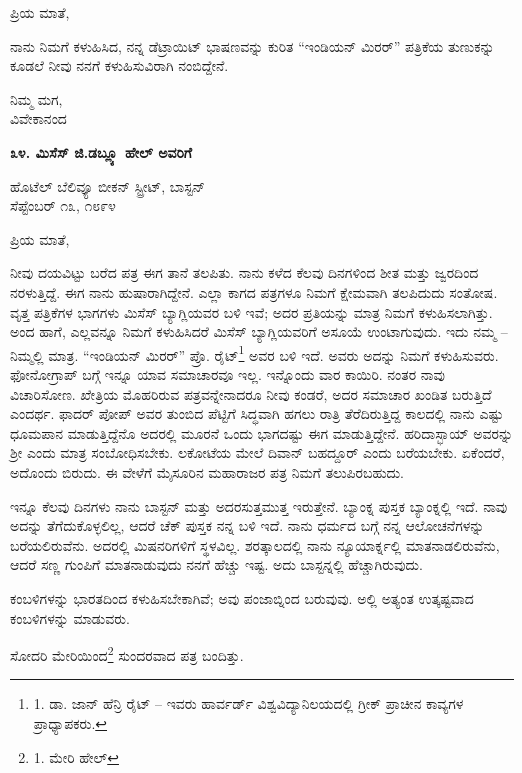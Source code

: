 ಪ್ರಿಯ ಮಾತೆ,

ನಾನು ನಿಮಗೆ ಕಳುಹಿಸಿದ, ನನ್ನ ಡೆಟ್ರಾಯಿಟ್ ಭಾಷಣವನ್ನು ಕುರಿತ “ಇಂಡಿಯನ್ ಮಿರರ್” ಪತ್ರಿಕೆಯ ತುಣುಕನ್ನು ಕೂಡಲೆ ನೀವು ನನಗೆ ಕಳುಹಿಸುವಿರಾಗಿ ನಂಬಿದ್ದೇನೆ.

\begin{flushright}
ನಿಮ್ಮ ಮಗ,\\ವಿವೇಕಾನಂದ
\end{flushright}

\begin{center}
\textbf{೩೪. ಮಿಸೆಸ್ ಜಿ.ಡಬ್ಲ್ಯೂ ಹೇಲ್ ಅವರಿಗೆ}
\end{center}

\begin{flushright}
ಹೊಟೆಲ್ ಬೆಲಿವ್ಯೂ ಬೀಕನ್ ಸ್ಟ್ರೀಟ್, ಬಾಸ್ಟನ್\\ಸೆಪ್ಟೆಂಬರ್ ೧೩, ೧೮೯೪
\end{flushright}

ಪ್ರಿಯ ಮಾತೆ,

ನೀವು ದಯವಿಟ್ಟು ಬರೆದ ಪತ್ರ ಈಗ ತಾನೆ ತಲಪಿತು. ನಾನು ಕಳೆದ ಕೆಲವು ದಿನಗಳಿಂದ ಶೀತ ಮತ್ತು ಜ್ವರದಿಂದ ನರಳುತ್ತಿದ್ದೆ. ಈಗ ನಾನು ಹುಷಾರಾಗಿದ್ದೇನೆ. ಎಲ್ಲಾ ಕಾಗದ ಪತ್ರಗಳೂ ನಿಮಗೆ ಕ್ಷೇಮವಾಗಿ ತಲಪಿದುದು ಸಂತೋಷ. ವೃತ್ತ ಪತ್ರಿಕೆಗಳ ಭಾಗಗಳು ಮಿಸೆಸ್ ಬ್ಯಾಗ್ಲಿಯವರ ಬಳಿ ಇವೆ; ಅದರ ಪ್ರತಿಯನ್ನು ಮಾತ್ರ ನಿಮಗೆ ಕಳುಹಿಸಲಾಗಿತ್ತು. ಅಂದ ಹಾಗೆ, ಎಲ್ಲವನ್ನೂ ನಿಮಗೆ ಕಳುಹಿಸಿದರೆ ಮಿಸೆಸ್ ಬ್ಯಾಗ್ಲಿಯವರಿಗೆ ಅಸೂಯೆ ಉಂಟಾಗುವುದು. ಇದು ನಮ್ಮ – ನಿಮ್ಮಲ್ಲಿ ಮಾತ್ರ. “ಇಂಡಿಯನ್ ಮಿರರ್” ಪ್ರೊ. ರೈಟ್\footnote{1. ಡಾ. ಜಾನ್ ಹೆನ್ರಿ ರೈಟ್ – ಇವರು ಹಾರ್ವರ್ಡ್ ವಿಶ್ವವಿದ್ಯಾನಿಲಯದಲ್ಲಿ ಗ್ರೀಕ್ ಪ್ರಾಚೀನ ಕಾವ್ಯಗಳ ಪ್ರಾಧ್ಯಾಪಕರು.} ಅವರ ಬಳಿ ಇದೆ. ಅವರು ಅದನ್ನು ನಿಮಗೆ ಕಳುಹಿಸುವರು. ಫೋನೋಗ್ರಾಪ್ ಬಗ್ಗೆ ಇನ್ನೂ ಯಾವ ಸಮಾಚಾರವೂ ಇಲ್ಲ. ಇನ್ನೊಂದು ವಾರ ಕಾಯಿರಿ. ನಂತರ ನಾವು ವಿಚಾರಿಸೋಣ. ಖೇತ್ರಿಯ ಮೊಹರಿರುವ ಪತ್ರವನ್ನೇನಾದರೂ ನೀವು ಕಂಡರೆ, ಅದರ ಸಮಾಚಾರ ಖಂಡಿತ ಬರುತ್ತಿದೆ ಎಂದರ್ಥ. ಫಾದರ್ ಪೋಪ್ ಅವರ ತುಂಬಿದ ಪೆಟ್ಟಿಗೆ ಸಿದ್ಧವಾಗಿ ಹಗಲು ರಾತ್ರಿ ತೆರೆದಿರುತ್ತಿದ್ದ ಕಾಲದಲ್ಲಿ ನಾನು ಎಷ್ಟು ಧೂಮಪಾನ ಮಾಡುತ್ತಿದ್ದೆನೊ ಅದರಲ್ಲಿ ಮೂರನೆ ಒಂದು ಭಾಗದಷ್ಟು ಈಗ ಮಾಡುತ್ತಿದ್ದೇನೆ. ಹರಿದಾಸ್ಭಾಯ್​ ಅವರನ್ನು ಶ‍್ರೀ ಎಂದು ಮಾತ್ರ ಸಂಬೋಧಿಸಬೇಕು. ಲಕೋಟೆಯ ಮೇಲೆ ದಿವಾನ್ ಬಹದ್ದೂರ್ ಎಂದು ಬರೆಯಬೇಕು. ಏಕೆಂದರೆ, ಅದೊಂದು ಬಿರುದು. ಈ ವೇಳೆಗೆ ಮೈಸೂರಿನ ಮಹಾರಾಜರ ಪತ್ರ ನಿಮಗೆ ತಲುಪಿರಬಹುದು.

ಇನ್ನೂ ಕೆಲವು ದಿನಗಳು ನಾನು ಬಾಸ್ಟನ್ ಮತ್ತು ಅದರಸುತ್ತಮುತ್ತ ಇರುತ್ತೇನೆ. ಬ್ಯಾಂಕ್ನ ಪುಸ್ತಕ ಬ್ಯಾಂಕ್ನಲ್ಲಿ ಇದೆ. ನಾವು ಅದನ್ನು ತೆಗೆದುಕೊಳ್ಳಲಿಲ್ಲ, ಆದರೆ ಚೆಕ್ ಪುಸ್ತಕ ನನ್ನ ಬಳಿ ಇದೆ. ನಾನು ಧರ್ಮದ ಬಗ್ಗೆ ನನ್ನ ಆಲೋಚನೆಗಳನ್ನು ಬರೆಯಲಿರುವೆನು. ಅದರಲ್ಲಿ ಮಿಷನರಿಗಳಿಗೆ ಸ್ಥಳವಿಲ್ಲ. ಶರತ್ಕಾಲದಲ್ಲಿ ನಾನು ನ್ಯೂಯಾರ್ಕ್ನಲ್ಲಿ ಮಾತನಾಡಲಿರುವೆನು, ಆದರೆ ಸಣ್ಣ ಗುಂಪಿಗೆ ಮಾತನಾಡುವುದು ನನಗೆ ಹೆಚ್ಚು ಇಷ್ಟ. ಅದು ಬಾಸ್ಟನ್ನಲ್ಲಿ ಹೆಚ್ಚಾಗಿರುವುದು.

ಕಂಬಳಿಗಳನ್ನು ಭಾರತದಿಂದ ಕಳುಹಿಸಬೇಕಾಗಿವೆ; ಅವು ಪಂಜಾಬ್ನಿಂದ ಬರುವುವು. ಅಲ್ಲಿ ಅತ್ಯಂತ ಉತ್ಕಷ್ಟವಾದ ಕಂಬಳಿಗಳನ್ನು ಮಾಡುವರು.

ಸೋದರಿ ಮೇರಿಯಿಂದ\footnote{1. ಮೇರಿ ಹೇಲ್} ಸುಂದರವಾದ ಪತ್ರ ಬಂದಿತ್ತು.

